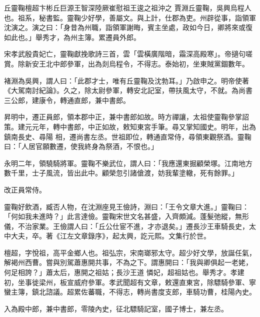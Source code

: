 
\begin{pinyinscope}

 丘靈鞠檀超卞彬丘巨源王智深陸厥崔慰祖王逡之祖沖之
 賈淵丘靈鞠，吳興烏程人也。祖系，秘書監。靈鞠少好學，善屬文。與上計，仕郡為吏。州辟從事，詣領軍沈演之。演之曰：「身昔為州職，詣領軍謝晦，賓主坐處，政如今日，卿將來或復如此也。」舉秀才，為州主簿。累遷員外郎。



 宋孝武殷貴妃亡，靈鞠獻挽歌詩三首，雲「雲橫廣階暗，霜深高殿寒」。帝擿句嗟賞。除新安王北中郎參軍，出為剡烏程令，不得志。泰始初，坐東賊黨錮數年。



 褚淵為吳興，謂人曰：「此郡才士，唯有丘靈鞠及沈勃耳。」乃啟申之。明帝使著《大駕南討紀論》。久之，除太尉參軍，轉安北記室，帶扶風太守，不就。為尚書三公郎，建康令，轉通直郎，兼中書郎。



 昇明中，遷正員郎，領本郡中正，兼中書郎如故。時方禪讓，太祖使靈鞠參掌詔策。建元元年，轉中書郎，中正如故，敕知東宮手筆。尋又掌知國史。明年，出為鎮南長史、尋陽
 相，遷尚書左丞。世祖即位，轉通直常侍，尋領東觀祭酒。靈鞠曰：「人居官願數遷，使我終身為祭酒，不恨也。」



 永明二年，領驍騎將軍。靈鞠不樂武位，謂人曰：「我應還東掘顧榮塚。江南地方數千里，士子風流，皆出此中。顧榮忽引諸傖渡，妨我輩塗轍，死有餘罪。」



 改正員常侍。



 靈鞠好飲酒，臧否人物，在沈淵座見王儉詩，淵曰：「王令文章大進。」靈鞠曰：「何如我未進時？」此言達儉。靈鞠宋世文名甚盛，入齊頗減。蓬髮弛縱，無形儀，不治家業。王儉謂人曰：「丘公仕宦不進，才亦退矣。」遷長沙王車騎長史，太中大夫，卒。著《江左文章錄序》，起太興，訖元熙。文集行於世。



 檀超，字悅祖，高平金鄉人也。祖弘宗，宋南瑯邪太守。超少好文學，放誕任氣，解褐州西曹。嘗與別駕蕭惠開共事，不為之下。謂惠開曰：「我與卿俱起一老姥，何足相誇？」蕭太后，惠開之祖姑；長沙王道
 憐妃，超祖姑也。舉秀才。孝建初，坐事徙梁州，板宣威府參軍。孝武聞超有文章，敕還直東宮，除驃騎參軍、寧蠻主簿，鎮北諮議。超累佐蕃職，不得志，轉尚書度支郎，車騎功曹，桂陽內史。



 入為殿中郎，兼中書郎，零陵內史，征北驃騎記室，國子博士，兼左丞。




\end{pinyinscope}
